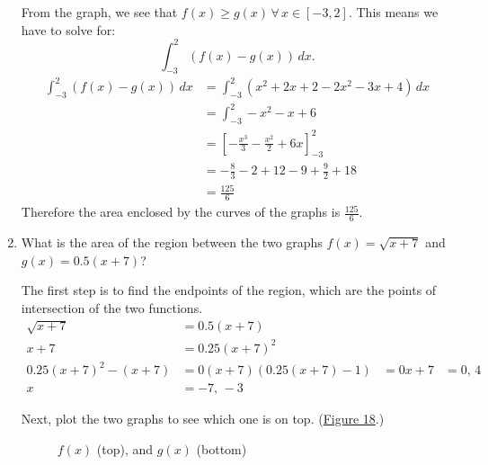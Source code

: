 \documentclass[12pt]{article}
\begin{document}
\begin{enumerate}
                    From the graph, we see that $f(x) \ge g(x) \, \forall \, x \in [-3, 2]$. This means we have to solve for:
                    \[ \int_{-3}^2 \left( f(x) - g(x) \right) \, dx. \]
                    \begin{align*}
                        \int_{-3}^2 \left( f(x) - g(x) \right) \, dx &= \int_{-3}^2 \left( x^2 + 2x + 2 - 2x^2 - 3x + 4 \right) \, dx \\[6pt]
                        &= \int_{-3}^2 -x^2 - x + 6 \\[6pt]
                        &= \left[ -\frac{x^3}{3} -\frac{x^2}{2} + 6x \right]_{-3}^2 \\[6pt]
                        &= -\frac{8}{3} - 2 + 12 - 9 +\frac{9}{2} + 18 \\[6pt]
                        &= \frac{125}{6}
                    \end{align*}
                    Therefore the area enclosed by the curves of the graphs is $\frac{125}{6}$.
                    \smallskip

                    \item What is the area of the region between the two graphs $f(x) = \sqrt{x+7}$ and $g(x) = 0.5(x+7)$?

                    The first step is to find the endpoints of the region, which are the points of intersection of the two functions.
                    \begin{align*}
                        \sqrt{x+7} &= 0.5(x+7) \\
                        x+7 &= 0.25(x+7)^2 \\
                        0.25(x+7)^2 - (x+7) &= 0
                        (x+7) \left( 0.25(x+7) - 1 \right) &= 0
                        x+7 &= 0, \, 4 \\
                        x &= -7, \, -3
                    \end{align*}

                    Next, plot the two graphs to see which one is on top. (\hyperref[fig:abcx2]{Figure 18}.)

                    \begin{figure}[H]
                        \begin{center}
                            \caption{$f(x)$ (top), and $g(x)$ (bottom)}
                            \label{fig:abcx2}
                        \end{center}
                    \end{figure}


\end{enumerate}
\end{document}
